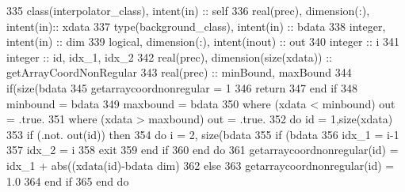 \begin{DoxyCode}
335     \textcolor{keywordtype}{class}(interpolator\_class), \textcolor{keywordtype}{intent(in)} :: self
336     \textcolor{keywordtype}{real(prec)}, \textcolor{keywordtype}{dimension(:)}, \textcolor{keywordtype}{intent(in)}:: xdata
337     \textcolor{keywordtype}{type}(background\_class), \textcolor{keywordtype}{intent(in)} :: bdata
338     \textcolor{keywordtype}{integer}, \textcolor{keywordtype}{intent(in)} :: dim
339     \textcolor{keywordtype}{logical}, \textcolor{keywordtype}{dimension(:)}, \textcolor{keywordtype}{intent(inout)} :: out
340     \textcolor{keywordtype}{integer} :: i                                                
341     \textcolor{keywordtype}{integer} :: id, idx\_1, idx\_2                                 
342     \textcolor{keywordtype}{real(prec)}, \textcolor{keywordtype}{dimension(size(xdata))} :: getArrayCoordNonRegular
343     \textcolor{keywordtype}{real(prec)} :: minBound, maxBound
344     \textcolor{keywordflow}{if}(\textcolor{keyword}{size}(bdata%
345         getarraycoordnonregular = 1
346         \textcolor{keywordflow}{return}
347 \textcolor{keywordflow}{    end if}
348     minbound = bdata%
349     maxbound = bdata%
350     \textcolor{keywordflow}{where} (xdata < minbound) out = .true.
351     \textcolor{keywordflow}{where} (xdata > maxbound) out = .true.
352     \textcolor{keywordflow}{do} id = 1,\textcolor{keyword}{size}(xdata)
353         \textcolor{keywordflow}{if} (.not. out(id)) \textcolor{keywordflow}{then}
354             \textcolor{keywordflow}{do} i = 2, \textcolor{keyword}{size}(bdata%
355                 \textcolor{keywordflow}{if} (bdata%
356                     idx\_1 = i-1
357                     idx\_2 = i
358                     \textcolor{keywordflow}{exit}
359 \textcolor{keywordflow}{                end if}
360 \textcolor{keywordflow}{            end do}
361             getarraycoordnonregular(id) = idx\_1 + abs((xdata(id)-bdata%
      dim)%
362         \textcolor{keywordflow}{else}
363             getarraycoordnonregular(id) = 1.0
364 \textcolor{keywordflow}{        end if}
365 \textcolor{keywordflow}{    end do}
\end{DoxyCode}
\mbox{\label{namespaceinterpolator__mod_a754f0cf5a885cf5f42a78728bb50c935}} 
